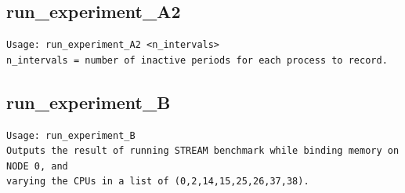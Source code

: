 \documentclass{article}
\begin{document}
\subsection{run\_experiment\_A2}
\begin{lstlisting}
Usage: run_experiment_A2 <n_intervals>
n_intervals = number of inactive periods for each process to record.
\end{lstlisting}
\subsection{run\_experiment\_B}
\begin{lstlisting}
Usage: run_experiment_B
Outputs the result of running STREAM benchmark while binding memory on NODE 0, and
varying the CPUs in a list of (0,2,14,15,25,26,37,38).
\end{lstlisting}
\end{document}
